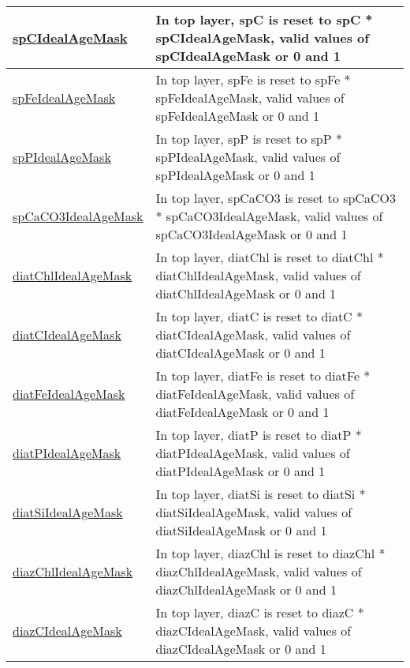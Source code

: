 {\begin{center}
\begin{longtable}{| p{2.0in} | p{4.0in} |}
    \hline
    \hyperref[subsec:var_sec_forcing_spCIdealAgeMask]{spCIdealAgeMask} & In top layer, spC is reset to spC * spCIdealAgeMask, valid values of spCIdealAgeMask or 0 and 1 \\
    \hline
    \hyperref[subsec:var_sec_forcing_spFeIdealAgeMask]{spFeIdealAgeMask} & In top layer, spFe is reset to spFe * spFeIdealAgeMask, valid values of spFeIdealAgeMask or 0 and 1 \\
    \hline
    \hyperref[subsec:var_sec_forcing_spPIdealAgeMask]{spPIdealAgeMask} & In top layer, spP is reset to spP * spPIdealAgeMask, valid values of spPIdealAgeMask or 0 and 1 \\
    \hline
    \hyperref[subsec:var_sec_forcing_spCaCO3IdealAgeMask]{spCaCO3IdealAgeMask} & In top layer, spCaCO3 is reset to spCaCO3 * spCaCO3IdealAgeMask, valid values of spCaCO3IdealAgeMask or 0 and 1 \\
    \hline
    \hyperref[subsec:var_sec_forcing_diatChlIdealAgeMask]{diatChlIdealAgeMask} & In top layer, diatChl is reset to diatChl * diatChlIdealAgeMask, valid values of diatChlIdealAgeMask or 0 and 1 \\
    \hline
    \hyperref[subsec:var_sec_forcing_diatCIdealAgeMask]{diatCIdealAgeMask} & In top layer, diatC is reset to diatC * diatCIdealAgeMask, valid values of diatCIdealAgeMask or 0 and 1 \\
    \hline
    \hyperref[subsec:var_sec_forcing_diatFeIdealAgeMask]{diatFeIdealAgeMask} & In top layer, diatFe is reset to diatFe * diatFeIdealAgeMask, valid values of diatFeIdealAgeMask or 0 and 1 \\
    \hline
    \hyperref[subsec:var_sec_forcing_diatPIdealAgeMask]{diatPIdealAgeMask} & In top layer, diatP is reset to diatP * diatPIdealAgeMask, valid values of diatPIdealAgeMask or 0 and 1 \\
    \hline
    \hyperref[subsec:var_sec_forcing_diatSiIdealAgeMask]{diatSiIdealAgeMask} & In top layer, diatSi is reset to diatSi * diatSiIdealAgeMask, valid values of diatSiIdealAgeMask or 0 and 1 \\
    \hline
    \hyperref[subsec:var_sec_forcing_diazChlIdealAgeMask]{diazChlIdealAgeMask} & In top layer, diazChl is reset to diazChl * diazChlIdealAgeMask, valid values of diazChlIdealAgeMask or 0 and 1 \\
    \hline
    \hyperref[subsec:var_sec_forcing_diazCIdealAgeMask]{diazCIdealAgeMask} & In top layer, diazC is reset to diazC * diazCIdealAgeMask, valid values of diazCIdealAgeMask or 0 and 1 \\

\end{longtable}
\end{center}}
